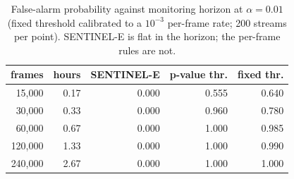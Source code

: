\begin{table}[t]
\centering
\caption{False-alarm probability against monitoring horizon at $\alpha=0.01$ (fixed threshold calibrated to a $10^{-3}$ per-frame rate; 200 streams per point). SENTINEL-E is flat in the horizon; the per-frame rules are not.}
\label{tab:horizon}
\begin{tabular}{rrrrr}
\toprule
frames & hours & SENTINEL-E & p-value thr. & fixed thr. \\
\midrule
15,000 & 0.17 & 0.000 & 0.555 & 0.640 \\
30,000 & 0.33 & 0.000 & 0.960 & 0.780 \\
60,000 & 0.67 & 0.000 & 1.000 & 0.985 \\
120,000 & 1.33 & 0.000 & 1.000 & 0.990 \\
240,000 & 2.67 & 0.000 & 1.000 & 1.000 \\
\bottomrule
\end{tabular}
\end{table}
